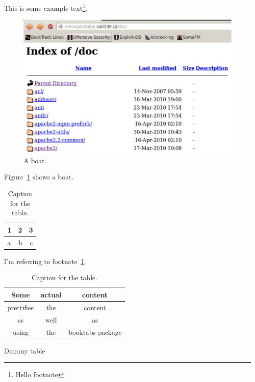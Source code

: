 \documentclass{article}
\begin{document}
This is some example text\footnote{\label{myfootnote}Hello footnote}.

\begin{figure}[h!]
	\includegraphics[width=\linewidth]{images/screenshot.png}
	\caption{A boat.}
	\label{fig:boat1}
\end{figure}

Figure~\ref{fig:boat1} shows a boat.

\begin{table}[h!]
	\centering
	\caption{Caption for the table.}
	\label{tab:table1}
	\begin{tabular}{l|c||r}
		1 & 2 & 3\\
		\hline
		a & b & c\\
	\end{tabular}
\end{table}

I'm referring to footnote~\ref{myfootnote}.

\begin{table}[h!]
	\centering
	\caption{Caption for the table.}
	\label{tab:table2}
	\begin{tabular}{ccc}
		\toprule
		Some & actual & content\\
		\midrule
		prettifies & the & content\\
		as & well & as\\
		using & the & booktabs package\\
		\bottomrule
	\end{tabular}
\end{table}

\newpage
\begin{table}
	\caption{Dummy table}
\end{table}
\end{document}
